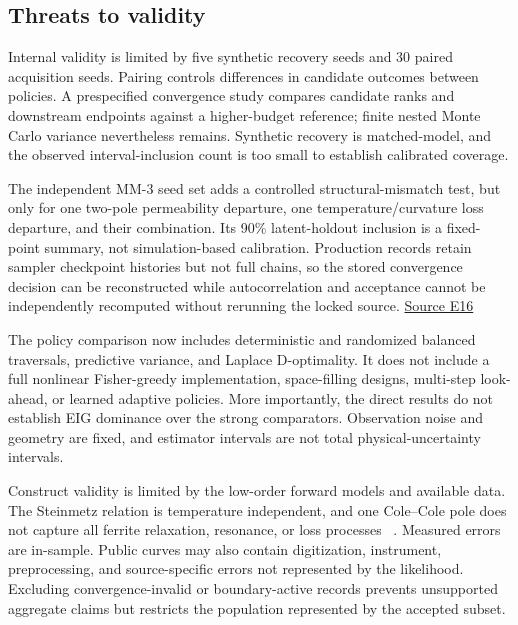 \hypertarget{threats-to-validity}{%
\subsection{Threats to validity}\label{threats-to-validity}}

Internal validity is limited by five synthetic recovery seeds and 30
paired acquisition seeds. Pairing controls differences in candidate
outcomes between policies. A prespecified convergence study compares
candidate ranks and downstream endpoints against a higher-budget
reference; finite nested Monte Carlo variance nevertheless remains.
Synthetic recovery is matched-model, and the observed interval-inclusion
count is too small to establish calibrated coverage.

The independent MM-3 seed set adds a controlled structural-mismatch
test, but only for one two-pole permeability departure, one
temperature/curvature loss departure, and their combination. Its 90\%
latent-holdout inclusion is a fixed- point summary, not simulation-based
calibration. Production records retain sampler checkpoint histories but
not full chains, so the stored convergence decision can be reconstructed
while autocorrelation and acceptance cannot be independently recomputed
without rerunning the locked source.
\href{https://github.com/hoangduong6210/EIG-bayesian-for-Recover-potential-Physical-Parameter-of-MagComponent/blob/a3e6326621d90123e5661c17e2d562fb0f5e0a41/wiki/evidence/Evidence-Sources.md\#e16}{Source
E16}

The policy comparison now includes deterministic and randomized balanced
traversals, predictive variance, and Laplace D-optimality. It does not
include a full nonlinear Fisher-greedy implementation, space-filling
designs, multi-step look-ahead, or learned adaptive policies. More
importantly, the direct results do not establish EIG dominance over the
strong comparators. Observation noise and geometry are fixed, and
estimator intervals are not total physical-uncertainty intervals.

Construct validity is limited by the low-order forward models and
available data. The Steinmetz relation is temperature independent, and
one Cole--Cole pole does not capture all ferrite relaxation, resonance,
or loss processes ~\citep{tsutaoka2003}. Measured errors are in-sample.
Public curves may also contain digitization, instrument, preprocessing,
and source-specific errors not represented by the likelihood. Excluding
convergence-invalid or boundary-active records prevents unsupported
aggregate claims but restricts the population represented by the
accepted subset.


